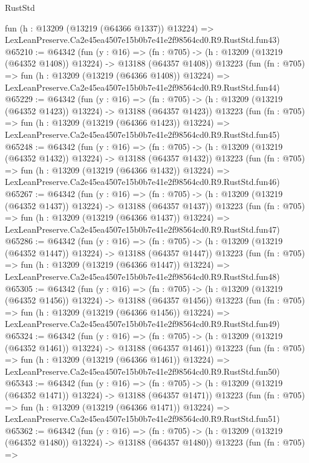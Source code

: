 \begin{lexlean}{RustStd}
\begin{coremodule}
    fun (h : @13209 (@13219 (@64366 @1337)) @13224) =>
    LexLeanPreserve.Ca2e45ea4507e15b0b7e41e2f98564cd0.R9.RustStd.fun43)
@65210 := @64342
    (fun (y : @16) =>
    (fn : @705) -> (h : @13209 (@13219 (@64352 @1408)) @13224) -> @13188 (@64357 @1408))
    @13223
    (fun (fn : @705) =>
    fun (h : @13209 (@13219 (@64366 @1408)) @13224) =>
    LexLeanPreserve.Ca2e45ea4507e15b0b7e41e2f98564cd0.R9.RustStd.fun44)
@65229 := @64342
    (fun (y : @16) =>
    (fn : @705) -> (h : @13209 (@13219 (@64352 @1423)) @13224) -> @13188 (@64357 @1423))
    @13223
    (fun (fn : @705) =>
    fun (h : @13209 (@13219 (@64366 @1423)) @13224) =>
    LexLeanPreserve.Ca2e45ea4507e15b0b7e41e2f98564cd0.R9.RustStd.fun45)
@65248 := @64342
    (fun (y : @16) =>
    (fn : @705) -> (h : @13209 (@13219 (@64352 @1432)) @13224) -> @13188 (@64357 @1432))
    @13223
    (fun (fn : @705) =>
    fun (h : @13209 (@13219 (@64366 @1432)) @13224) =>
    LexLeanPreserve.Ca2e45ea4507e15b0b7e41e2f98564cd0.R9.RustStd.fun46)
@65267 := @64342
    (fun (y : @16) =>
    (fn : @705) -> (h : @13209 (@13219 (@64352 @1437)) @13224) -> @13188 (@64357 @1437))
    @13223
    (fun (fn : @705) =>
    fun (h : @13209 (@13219 (@64366 @1437)) @13224) =>
    LexLeanPreserve.Ca2e45ea4507e15b0b7e41e2f98564cd0.R9.RustStd.fun47)
@65286 := @64342
    (fun (y : @16) =>
    (fn : @705) -> (h : @13209 (@13219 (@64352 @1447)) @13224) -> @13188 (@64357 @1447))
    @13223
    (fun (fn : @705) =>
    fun (h : @13209 (@13219 (@64366 @1447)) @13224) =>
    LexLeanPreserve.Ca2e45ea4507e15b0b7e41e2f98564cd0.R9.RustStd.fun48)
@65305 := @64342
    (fun (y : @16) =>
    (fn : @705) -> (h : @13209 (@13219 (@64352 @1456)) @13224) -> @13188 (@64357 @1456))
    @13223
    (fun (fn : @705) =>
    fun (h : @13209 (@13219 (@64366 @1456)) @13224) =>
    LexLeanPreserve.Ca2e45ea4507e15b0b7e41e2f98564cd0.R9.RustStd.fun49)
@65324 := @64342
    (fun (y : @16) =>
    (fn : @705) -> (h : @13209 (@13219 (@64352 @1461)) @13224) -> @13188 (@64357 @1461))
    @13223
    (fun (fn : @705) =>
    fun (h : @13209 (@13219 (@64366 @1461)) @13224) =>
    LexLeanPreserve.Ca2e45ea4507e15b0b7e41e2f98564cd0.R9.RustStd.fun50)
@65343 := @64342
    (fun (y : @16) =>
    (fn : @705) -> (h : @13209 (@13219 (@64352 @1471)) @13224) -> @13188 (@64357 @1471))
    @13223
    (fun (fn : @705) =>
    fun (h : @13209 (@13219 (@64366 @1471)) @13224) =>
    LexLeanPreserve.Ca2e45ea4507e15b0b7e41e2f98564cd0.R9.RustStd.fun51)
@65362 := @64342
    (fun (y : @16) =>
    (fn : @705) -> (h : @13209 (@13219 (@64352 @1480)) @13224) -> @13188 (@64357 @1480))
    @13223
    (fun (fn : @705) =>

\end{coremodule}
\end{lexlean}
